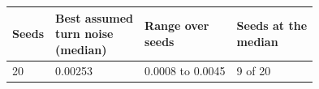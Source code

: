 \begin{tabular}{llll}
\toprule
Seeds & \shortstack[l]{Best assumed\\turn noise\\(median)} & \shortstack[l]{Range over\\seeds} & \shortstack[l]{Seeds at the\\median} \\
\midrule
20 & 0.00253 & 0.0008 to 0.0045 & 9 of 20 \\
\bottomrule
\end{tabular}
